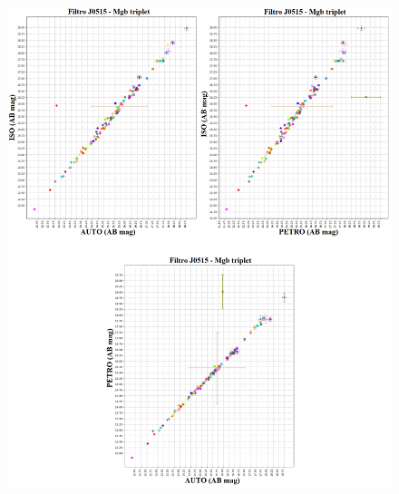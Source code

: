 \begin{anexosenv}
    \begin{figure}[h]
        \centering
        \includegraphics[width=1.0\textwidth]{Imagens/J0515_iso_auto.png}
        \caption[]{}
        \label{fig:J0515_iso_auto} 
    \end{figure}


\end{anexosenv}
